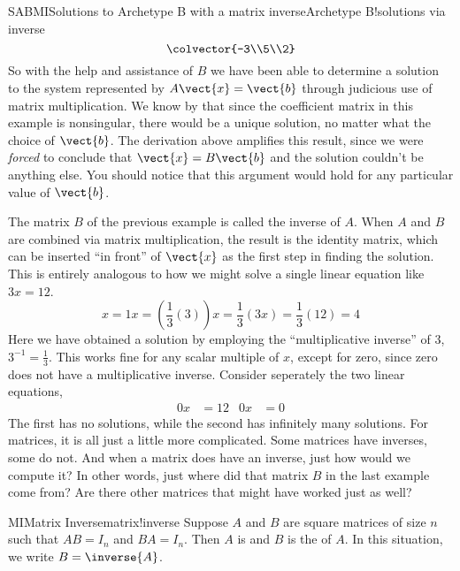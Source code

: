 \begin{example}{SABMI}{Solutions to Archetype B with a matrix inverse}{Archetype B!solutions via inverse}
\begin{equation*}
\colvector{-3\\5\\2}
\end{equation*}
%
So with the help and assistance of $B$ we have been able to determine a solution to the system represented by $A\vect{x}=\vect{b}$ through judicious use of matrix multiplication.  We know by  that since the coefficient matrix in this example is nonsingular, there would be a unique solution, no matter what the choice of $\vect{b}$.  The derivation above amplifies this result, since we were {\em forced} to conclude that $\vect{x}=B\vect{b}$ and the solution couldn't be anything else.  You should notice that this argument would hold for any particular value of $\vect{b}$.
\end{example}
%
The matrix $B$ of the previous example is called the inverse of $A$.  When $A$ and $B$ are combined via matrix multiplication, the result is the identity matrix, which can be inserted ``in front'' of  $\vect{x}$ as the first step in finding the solution.  This is entirely analogous to how we might solve a single linear equation like $3x=12$.  
%
\begin{equation*}
x=1x=\left(\frac{1}{3}\left(3\right)\right)x=\frac{1}{3}\left(3x\right)=\frac{1}{3}\left(12\right)=4
\end{equation*}
%
Here we have obtained a solution by employing the ``multiplicative inverse'' of $3$, $3^{-1}=\frac{1}{3}$.  This works fine for any scalar multiple of $x$, except for zero, since zero does not have a multiplicative inverse.  Consider seperately the two linear equations,
%
\begin{align*}
0x&=12
&
0x&=0
\end{align*}
%
The first has no solutions, while the second has infinitely many solutions.  For matrices, it is all just a little more complicated.  Some matrices have inverses, some do not.  And when a matrix does have an inverse, just how would we compute it?  In other words, just where did that matrix $B$ in the last example come from?  Are there other matrices that might have worked just as well?
%
%
\begin{definition}{MI}{Matrix Inverse}{matrix!inverse}
Suppose $A$ and $B$ are square matrices of size $n$ such that $AB=I_n$ and $BA=I_n$.  Then $A$ is  and $B$ is the  of $A$.  In this situation, we write $B=\inverse{A}$.
\end{definition}
